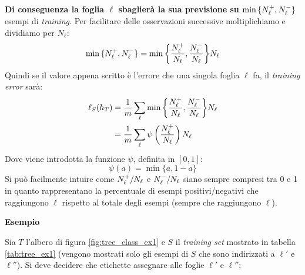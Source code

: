 \textbf{Di conseguenza la foglia $\ell$ sbaglierà la sua previsione su
$\min{\{\ensuremath{N_{\ell}^+},\ensuremath{N_{\ell}^-}\}}$} esempi di \textit{training}. Per facilitare delle osservazioni
successive moltiplichiamo e dividiamo per $N_{\ell}$:
$$ \min{\{\ensuremath{N_{\ell}^+},\ensuremath{N_{\ell}^-}\}} = 
\min{\left\{\frac{\ensuremath{N_{\ell}^+}}{N_{\ell}},\frac{\ensuremath{N_{\ell}^-}}{N_{\ell}}\right\}}N_{\ell} $$
Quindi se il valore appena scritto è l'errore che una singola foglia $\ell$ fa, il
\textit{training error} sarà:
$$ 
\begin{aligned}
\ell_{S}(h_T)
&=\frac{1}{m}\sum_{\ell}\min{\left\{\frac{\ensuremath{N_{\ell}^+}}{N_{\ell}},\frac{\ensuremath{N_{\ell}^-}}{N_{\ell}}\right\}}N_{\ell}\\
&=\frac{1}{m}\sum_{\ell} \psi \left(\frac{N_{\ell}^+}{N_{\ell}}\right)N_{\ell}\\
\end{aligned}
$$
Dove viene introdotta la funzione $\psi$, definita in $[0,1]$:
$$\psi(a) = \min{\{a,1-a\}}$$
Si può facilmente intuire come $N_{\ell}^+/N_{\ell}$ e $N_{\ell}^-/N_{\ell}$ siano
sempre compresi tra 0 e 1 in quanto rappresentano la percentuale di esempi positivi/negativi
che raggiungono $\ell$ rispetto al totale degli esempi (sempre che raggiungono $\ell$).

\textbf{Esempio}

Sia $T$ l'albero di figura \ref{fig:tree_class_ex1} e $S$ il \textit{training set} mostrato
in tabella \ref{tab:tree_ex1} (vengono mostrati solo gli esempi di $S$ che sono
indirizzati a $\ell'$ e $\ell''$).
Si deve decidere che etichette assegnare alle foglie $\ell'$ e $\ell''$;


